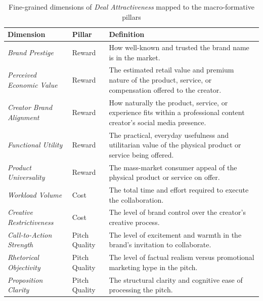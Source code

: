 \begin{table}[!htbp]
    \centering
    \footnotesize
    \setlength{\tabcolsep}{4pt}
    \renewcommand{\arraystretch}{1.08}
    \caption{Fine-grained dimensions of \textit{Deal Attractiveness} mapped to the macro-formative pillars}
    \label{tab:barter_formative_dimensions}
    \begin{tabularx}{\textwidth}{@{}
        >{\raggedright\arraybackslash}p{}
        >{\raggedright\arraybackslash}p{}
        >{\raggedright\arraybackslash}X
    @{}}
    \toprule
    Dimension & Pillar & Definition \\
    \midrule
    \textit{Brand Prestige} & Reward & How well-known and trusted the brand name is in the market. \\
    \textit{Perceived Economic Value} & Reward & The estimated retail value and premium nature of the product, service, or compensation offered to the creator. \\
    \textit{Creator Brand Alignment} & Reward & How naturally the product, service, or experience fits within a professional content creator's social media presence. \\
    \textit{Functional Utility} & Reward & The practical, everyday usefulness and utilitarian value of the physical product or service being offered. \\
    \textit{Product Universality} & Reward & The mass-market consumer appeal of the physical product or service on offer. \\
    \midrule
    \textit{Workload Volume} & Cost & The total time and effort required to execute the collaboration. \\
    \textit{Creative Restrictiveness} & Cost & The level of brand control over the creator's creative process. \\
    \midrule
    \textit{Call-to-Action Strength} & Pitch Quality & The level of excitement and warmth in the brand's invitation to collaborate. \\
    \textit{Rhetorical Objectivity} & Pitch Quality & The level of factual realism versus promotional marketing hype in the pitch. \\
    \textit{Proposition Clarity} & Pitch Quality & The structural clarity and cognitive ease of processing the pitch. \\
    \bottomrule
    \end{tabularx}
\end{table}



